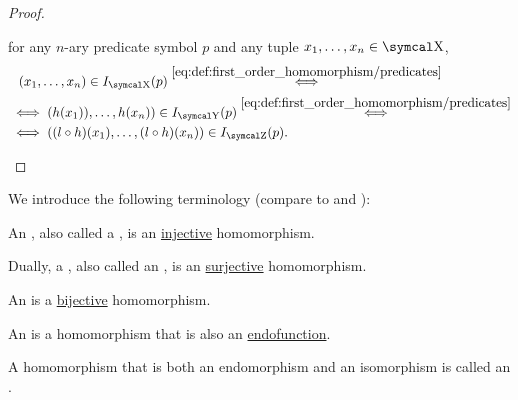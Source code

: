 \begin{proof}
\begin{RefList}
     for any \( n \)-ary predicate symbol \( p \) and any tuple \( x_1, \ldots, x_n \in \CX \),
    \begin{align*}
      &{}\phantom{=}{}
      (x_1, \ldots, x_n) \in I_{\CX}(p)
      \overset {\eqref{eq:def:first_order_homomorphism/predicates}} \iff \\ &\iff
      (h(x_1)), \ldots, h(x_n)) \in I_{\CY}(p)
      \overset {\eqref{eq:def:first_order_homomorphism/predicates}} \iff \\ &\iff
      ((l \circ h)(x_1), \ldots, (l \circ h)(x_n)) \in I_{\CZ}(p).
    \end{align*}
  \end{RefList}
\end{proof}

\begin{definition}\label{def:first_order_homomorphism_inveritibility}
  We introduce the following terminology (compare to  and ):
  \begin{DefEnum}
     An , also called a , is an \hyperref[def:function_invertibility/injection]{injective} homomorphism.

     Dually, a , also called an , is an \hyperref[def:function_invertibility/surjection]{surjective} homomorphism.

     An  is a \hyperref[def:function_invertibility/bijection]{bijective} homomorphism.

     An  is a homomorphism that is also an \hyperref[def:endofunction]{endofunction}.

     A homomorphism that is both an endomorphism and an isomorphism is called an .
  \end{DefEnum}
\end{definition}

